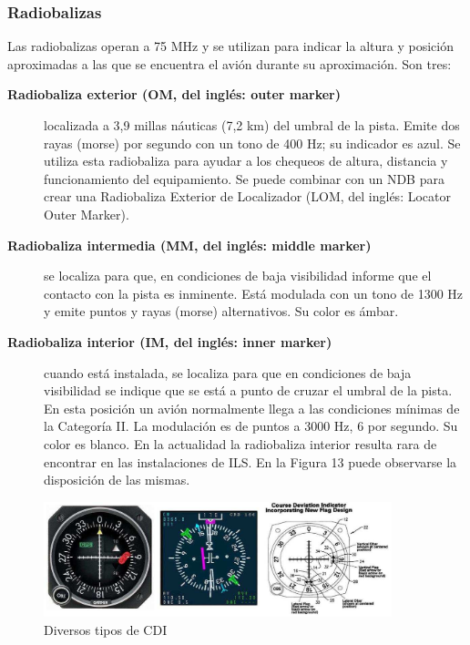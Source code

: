 \subsubsection{Radiobalizas}
\label{sec:06.ILS.radiobalizas}


Las radiobalizas operan a 75 MHz y se utilizan para indicar la altura y posición aproximadas a
las que se encuentra el avión durante su aproximación.
Son tres:
\begin{description}
\item [\bf Radiobaliza exterior (OM, del inglés: outer marker)] localizada
  a 3,9 millas náuticas (7,2 km) del umbral de la pista. Emite dos
  rayas (morse) por segundo con un tono de 400 Hz; su indicador es
  azul. Se utiliza esta radiobaliza para ayudar a los chequeos de
  altura, distancia y funcionamiento del equipamiento. Se puede
  combinar con un NDB para crear una Radiobaliza Exterior de
  Localizador (LOM, del inglés: Locator Outer Marker).
  \item [\bf Radiobaliza
  intermedia (MM, del inglés: middle marker)] se localiza para que, en
  condiciones de baja visibilidad informe que el contacto con la pista
  es inminente. Está modulada con un tono de 1300 Hz y emite puntos y
  rayas (morse) alternativos. Su color es ámbar.  
\item [ \bf Radiobaliza interior  (IM, del inglés: inner marker)] cuando está instalada, se localiza
  para que en condiciones de baja visibilidad se indique que se está a
  punto de cruzar el umbral de la pista. En esta posición un avión
  normalmente llega a las condiciones mínimas de la Categoría II. La
  modulación es de puntos a 3000 Hz, 6 por segundo. Su color es
  blanco.  En la actualidad la radiobaliza interior resulta rara de
  encontrar en las instalaciones de ILS. En la Figura 13 puede
  observarse la disposición de las mismas.
\end{description}


\begin{figure}[!htb]
  \centering
  \includegraphics[width = 0.9\textwidth]{06.radionavegacion/Imagenes/06.Sistemas.Aproximacion/06_ILS_CDI.png}
  \caption{Diversos tipos de CDI}
  \label{fig:06.ILS.CDI}
\end{figure}

